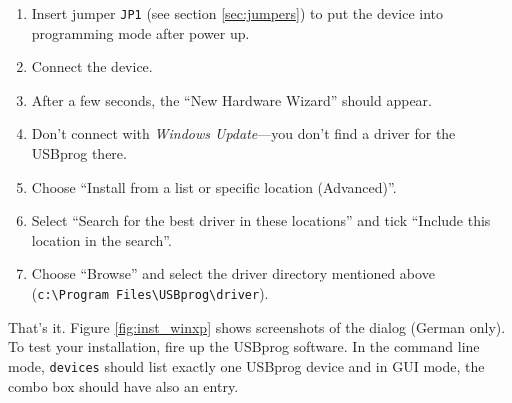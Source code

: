 \documentclass[bibtotoc,UKenglish,halfparskip,oneside,DIV12]{scrreprt}
\begin{document}
\begin{enumerate}
  \item Insert jumper \texttt{JP1} (see section \vref{sec:jumpers}) to put the device into
    programming mode after power up.
  \item Connect the device.
  \item After a few seconds, the ``New Hardware Wizard'' should appear.
  \item Don't connect with \emph{Windows Update}---you don't find a driver for the USBprog there.
  \item Choose ``Install from a list or specific location (Advanced)''.
  \item Select ``Search for the best driver in these locations'' and tick ``Include this location in
    the search''.
  \item Choose ``Browse'' and select the driver directory mentioned above \newline
    (\texttt{c:\textbackslash{}Program Files\textbackslash{}USBprog\textbackslash{}driver}).
\end{enumerate}

That's it. Figure \vref{fig:inst_winxp} shows screenshots of the dialog (German only). To test your
installation, fire up the USBprog software. In the command line mode, \texttt{devices} should list
exactly one USBprog device and in GUI mode, the combo box should have also an entry.
\end{document}
